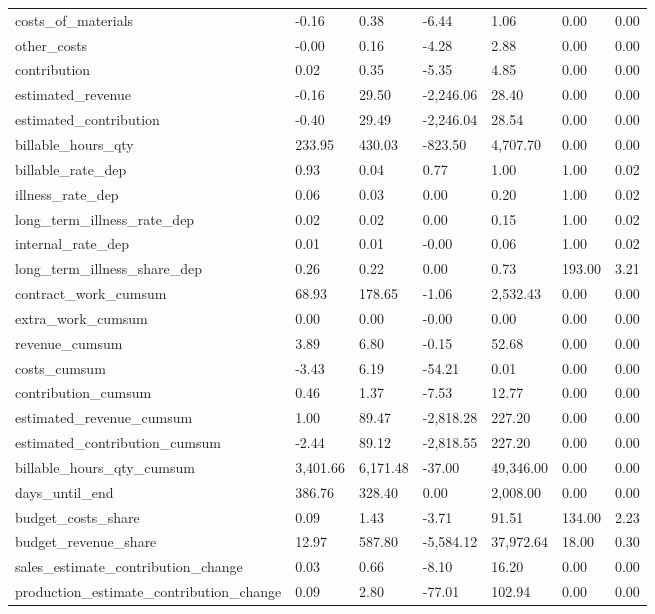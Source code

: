 \begin{landscape}
\begin{longtable}[h!]{lllllll}
costs_of_materials & -0.16 & 0.38 & -6.44 & 1.06 & 0.00 & 0.00 \\
other_costs & -0.00 & 0.16 & -4.28 & 2.88 & 0.00 & 0.00 \\
contribution & 0.02 & 0.35 & -5.35 & 4.85 & 0.00 & 0.00 \\
estimated_revenue & -0.16 & 29.50 & -2,246.06 & 28.40 & 0.00 & 0.00 \\
estimated_contribution & -0.40 & 29.49 & -2,246.04 & 28.54 & 0.00 & 0.00 \\
billable_hours_qty & 233.95 & 430.03 & -823.50 & 4,707.70 & 0.00 & 0.00 \\
billable_rate_dep & 0.93 & 0.04 & 0.77 & 1.00 & 1.00 & 0.02 \\
illness_rate_dep & 0.06 & 0.03 & 0.00 & 0.20 & 1.00 & 0.02 \\
long_term_illness_rate_dep & 0.02 & 0.02 & 0.00 & 0.15 & 1.00 & 0.02 \\
internal_rate_dep & 0.01 & 0.01 & -0.00 & 0.06 & 1.00 & 0.02 \\
long_term_illness_share_dep & 0.26 & 0.22 & 0.00 & 0.73 & 193.00 & 3.21 \\
contract_work_cumsum & 68.93 & 178.65 & -1.06 & 2,532.43 & 0.00 & 0.00 \\
extra_work_cumsum & 0.00 & 0.00 & -0.00 & 0.00 & 0.00 & 0.00 \\
revenue_cumsum & 3.89 & 6.80 & -0.15 & 52.68 & 0.00 & 0.00 \\
costs_cumsum & -3.43 & 6.19 & -54.21 & 0.01 & 0.00 & 0.00 \\
contribution_cumsum & 0.46 & 1.37 & -7.53 & 12.77 & 0.00 & 0.00 \\
estimated_revenue_cumsum & 1.00 & 89.47 & -2,818.28 & 227.20 & 0.00 & 0.00 \\
estimated_contribution_cumsum & -2.44 & 89.12 & -2,818.55 & 227.20 & 0.00 & 0.00 \\
billable_hours_qty_cumsum & 3,401.66 & 6,171.48 & -37.00 & 49,346.00 & 0.00 & 0.00 \\
days_until_end & 386.76 & 328.40 & 0.00 & 2,008.00 & 0.00 & 0.00 \\
budget_costs_share & 0.09 & 1.43 & -3.71 & 91.51 & 134.00 & 2.23 \\
budget_revenue_share & 12.97 & 587.80 & -5,584.12 & 37,972.64 & 18.00 & 0.30 \\
sales_estimate_contribution_change & 0.03 & 0.66 & -8.10 & 16.20 & 0.00 & 0.00 \\
production_estimate_contribution_change & 0.09 & 2.80 & -77.01 & 102.94 & 0.00 & 0.00 \\

\end{longtable}
\end{landscape}
